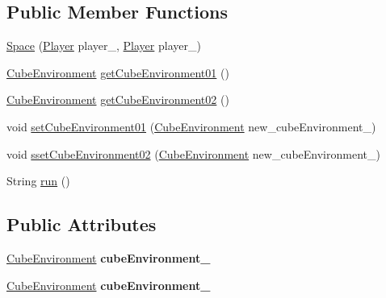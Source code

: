 \subsection*{Public Member Functions}
\begin{DoxyCompactItemize}
\item 
\hyperlink{classspace_pig_fighter_package_1_1_space_acc82deac40857c4b4634d1d586a953c3}{Space} (\hyperlink{classplayer_package_1_1_player}{Player} player\+\_, \hyperlink{classplayer_package_1_1_player}{Player} player\+\_)
\item 
\hyperlink{classcube_environment_1_1_cube_environment}{Cube\+Environment} \hyperlink{classspace_pig_fighter_package_1_1_space_a1988b77ec438cb872e6b6835346ae197}{get\+Cube\+Environment01} ()
\item 
\hyperlink{classcube_environment_1_1_cube_environment}{Cube\+Environment} \hyperlink{classspace_pig_fighter_package_1_1_space_ae4bf3ede16be09eecbf405f38a1ee265}{get\+Cube\+Environment02} ()
\item 
void \hyperlink{classspace_pig_fighter_package_1_1_space_a78fdde1cef2396b9f53954f79ddacdbf}{set\+Cube\+Environment01} (\hyperlink{classcube_environment_1_1_cube_environment}{Cube\+Environment} new\+\_\+cube\+Environment\+\_)
\item 
void \hyperlink{classspace_pig_fighter_package_1_1_space_a49a1da87cb6b0905fd3aa5e2a45b39b2}{sset\+Cube\+Environment02} (\hyperlink{classcube_environment_1_1_cube_environment}{Cube\+Environment} new\+\_\+cube\+Environment\+\_)
\item 
String \hyperlink{classspace_pig_fighter_package_1_1_space_ad6fdcc04d31a9b7f50fc5be0baebe71c}{run} ()
\end{DoxyCompactItemize}
\subsection*{Public Attributes}
\begin{DoxyCompactItemize}
\item 
\hyperlink{classcube_environment_1_1_cube_environment}{Cube\+Environment} {\bfseries cube\+Environment\+\_}\hypertarget{classspace_pig_fighter_package_1_1_space_a1d1a8c4c70053158b0bbdf6e101e8f50}{}\label{classspace_pig_fighter_package_1_1_space_a1d1a8c4c70053158b0bbdf6e101e8f50}

\item 
\hyperlink{classcube_environment_1_1_cube_environment}{Cube\+Environment} {\bfseries cube\+Environment\+\_}\hypertarget{classspace_pig_fighter_package_1_1_space_a5060ae0f965e0121658a8f305bfbe810}{}\label{classspace_pig_fighter_package_1_1_space_a5060ae0f965e0121658a8f305bfbe810}

\end{DoxyCompactItemize}


